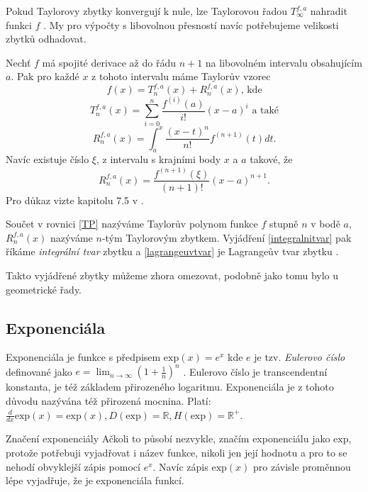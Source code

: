 Pokud Taylorovy zbytky konvergují k nule, lze Taylorovou řadou $T_\infty^{f,a}$ nahradit funkci $f$ \cite{ZDVNNR}. My pro výpočty s libovolnou přesností navíc potřebujeme velikosti zbytků odhadovat.

\begin{fact}
Nechť $f$ má spojité derivace až do řádu $n+1$ na libovolném intervalu obsahujícím $a$. Pak pro každé $x$ z tohoto intervalu máme Taylorův vzorec
\begin{equation}
f(x) = T_n^{f,a}(x) + R_n^{f,a}(x)\text{, kde}
\end{equation}
\begin{equation}\label{TP}
T_n^{f,a}(x) = \sum_{i=0}^{n}\frac{f^{(i)}(a)}{i!}(x-a)^i\text{~a~také}
\end{equation}
\begin{equation}\label{integralnitvar}
R_n^{f,a}(x)=\int_a^x\frac{(x-t)^n}{n!}f^{(n+1)}(t)dt.
\end{equation}
Navíc existuje číslo $\xi$, z intervalu s krajními body $x$ a $a$ takové, že
\begin{equation}\label{lagrangeuvtvar}
R_n^{f,a}(x)=\frac{f^{(n+1)}(\xi)}{(n+1)!}(x-a)^{n+1}.
\end{equation}
Pro důkaz vizte kapitolu 7.5 v \cite{TMA:Calculus}.
\end{fact}

Součet v rovnici \eqref{TP} nazýváme Taylorův polynom funkce $f$ stupně $n$ v bodě $a$, $R_n^{f,a}(x)$ nazýváme $n$-tým Taylorovým zbytkem. Vyjádření \eqref{integralnitvar} pak říkáme \textit{integrální tvar} zbytku a \eqref{lagrangeuvtvar} je Lagrangeův tvar zbytku \cite{MTTP}.

Takto vyjádřené zbytky můžeme zhora omezovat, podobně jako tomu bylo u geometrické řady. 

\subsection{Exponenciála}
Exponenciála je funkce s předpisem $\mathrm{exp}(x) = e^x$ kde $e$ je tzv. \textit{Eulerovo číslo} definované jako $e=\lim_{n\to\infty}\left(1+\frac{1}{n}\right)^n$ \cite{EPJVMAI}. Eulerovo číslo je transcendentní konstanta, je též základem přirozeného logaritmu. Exponenciála je z tohoto důvodu nazývána též přirozená mocnina. Platí: $\frac{d}{dx}\mathrm{exp}(x)=\mathrm{exp}(x),D(\mathrm{exp})=\mathbb{R},H(\mathrm{exp})=\mathbb{R}^+$.

\begin{myremark}{Značení exponenciály}
Ačkoli to působí nezvykle, značím exponenciálu jako $\mathrm{exp}$, protože potřebuji vyjadřovat i název funkce, nikoli jen její hodnotu a pro to se nehodí obvyklejší zápis pomocí $e^x$. Navíc zápis $\mathrm{exp}(x)$ pro závisle proměnnou lépe vyjadřuje, že je exponenciála funkcí.
\end{myremark}

